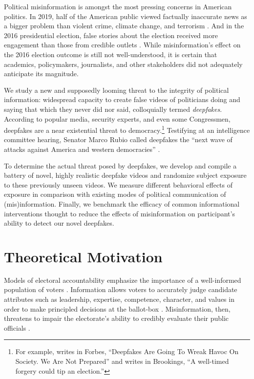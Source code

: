 \documentclass[12pt,letterpaper]{article}
\begin{document}
Political misinformation is amongst the most pressing concerns in American politics. In 2019, half of the American public viewed factually inaccurate news as a bigger problem than violent crime, climate change, and terrorism \citep{mitchell2019many}. And in the 2016 presidential election, false stories about the election received more engagement than those from credible outlets \citep{silverman2016}. While misinformation's effect on the 2016 election outcome is still not well-understood, it is certain that academics, policymakers, journalists, and other stakeholders did not adequately anticipate its magnitude.

We study a new and supposedly looming threat to the integrity of political information: widespread capacity to create false videos of politicians doing and saying that which they never did nor said, colloquially termed \textit{deepfakes}. According to popular media, security experts, and even some Congressmen,  deepfakes are a near existential threat to democracy.\footnote{For example, \citet{forbes20} writes in Forbes, ``Deepfakes Are Going To Wreak Havoc On Society. We Are Not Prepared'' and \citet{galston2020} writes in Brookings, ``A well-timed forgery could tip an election.''} Testifying at an intelligence committee hearing, Senator Marco Rubio called deepfakes the ``next wave of attacks against America and western democracies'' \citep{rubio_testimony}. 

To determine the actual threat posed by deepfakes, we develop and compile a battery of novel, highly realistic deepfake videos and randomize subject exposure to these previously unseen videos. We measure different behavioral effects of exposure in comparison with existing modes of political communication of (mis)information. Finally, we benchmark the efficacy of common informational interventions thought to reduce the effects of misinformation on participant's ability to detect our novel deepfakes.

\section{Theoretical Motivation}\label{theory}

Models of electoral accountability emphasize the importance of a well-informed population of voters  \citep{barro73,holmstrom82,ferejohn86,rogoff87,fearon99,besley06}. 
Information allows voters to accurately judge candidate attributes such as leadership, expertise, competence, character, and values in order to make principled decisions at the ballot-box \citep{pierce1993political, caprara2006personality, alexander1993gender}. Misinformation, then, threatens to impair the electorate's ability to credibly evaluate their public officials \citep{hollyer2019transparency}. 
\end{document}
